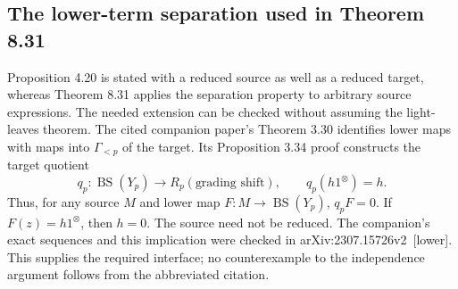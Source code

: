 \documentclass[10pt]{article}
\begin{document}
\subsection*{The lower-term separation used in Theorem 8.31}
Proposition 4.20 is stated with a reduced source as well as a reduced target, whereas Theorem 8.31 applies the separation property to arbitrary source expressions. The needed extension can be checked without assuming the light-leaves theorem. The cited companion paper’s Theorem 3.30 identifies lower maps with maps into \(\Gamma_{<p}\) of the target. Its Proposition 3.34 proof constructs the target quotient \[q_p:\operatorname{BS}(Y_p)\longrightarrow R_p(\text{grading shift}),
 \qquad q_p(h1^\otimes)=h.\] Thus, for any source \(M\) and lower map \(F:M\to\operatorname{BS}(Y_p)\), \(q_pF=0\). If \(F(z)=h1^\otimes\), then \(h=0\). The source need not be reduced. The companion’s exact sequences and this implication were checked in arXiv:2307.15726v2 [lower]. This supplies the required interface; no counterexample to the independence argument follows from the abbreviated citation.\par
\end{document}
